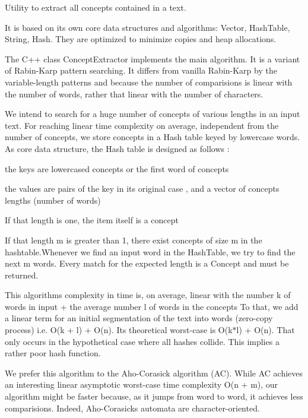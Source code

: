 Utility to extract all concepts contained in a text.

It is based on its own core data structures and algorithms\+: Vector, Hash\+Table, String, Hash. They are optimized to minimize copies and heap allocations.

The C++ class Concept\+Extractor implements the main algorithm. It is a variant of Rabin-\/\+Karp pattern searching. It differs from vanilla Rabin-\/\+Karp by the variable-\/length patterns and because the number of comparisions is linear with the number of words, rather that linear with the number of characters.

We intend to search for a huge number of concepts of various lengths in an input text. For reaching linear time complexity on average, independent from the number of concepts, we store concepts in a Hash table keyed by lowercase words. As core data structure, the Hash table is designed as follows \+:
\begin{DoxyEnumerate}
\item the keys are lowercased concepts or the first word of concepts
\item the values are pairs of the key in its original case , and a vector of concepts lengths (number of words)
\begin{DoxyItemize}
\item If that length is one, the item itself is a concept
\item If that length m is greater than 1, there exist concepts of size m in the hashtable.Whenever we find an input word in the Hash\+Table, we try to find the next m words. Every match for the expected length is a Concept and must be returned.
\end{DoxyItemize}
\end{DoxyEnumerate}

This algorithm\textquotesingle{}s complexity in time is, on average, linear with the number k of words in input + the average number l of words in the concepts To that, we add a linear term for an initial segmentation of the text into words (zero-\/copy process) i.\+e. O(k + l) + O(n). Its theoretical worst-\/case is O(k$\ast$l) + O(n). That only occurs in the hypothetical case where all hashes collide. This implies a rather poor hash function.

We prefer this algorithm to the Aho-\/\+Corasick algorithm (AC). While AC achieves an interesting linear asymptotic worst-\/case time complexity O(n + m), our algorithm might be faster because, as it jumps from word to word, it achieves less comparisions. Indeed, Aho-\/\+Corasick\textquotesingle{}s automata are character-\/oriented.

